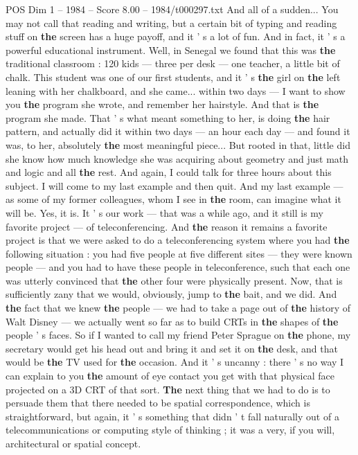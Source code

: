 \begin{textsample}{POS Dim 1 – 1984 – Score 8.00 – 1984/t000297.txt}
And all of a sudden...
You may not call that reading and writing, but a certain bit of typing and reading stuff on \textbf{the} screen has a huge payoff, and it ' s a lot of fun.
And in fact, it ' s a powerful educational instrument.
Well, in Senegal we found that this was \textbf{the} traditional classroom : 120 kids — three per desk — one teacher, a little bit of chalk.
This student was one of our first students, and it ' s \textbf{the} girl on \textbf{the} left leaning with her chalkboard, and she came... within two days — I want to show you \textbf{the} program she wrote, and remember her hairstyle.
And that is \textbf{the} program she made.
That ' s what meant something to her, is doing \textbf{the} hair pattern, and actually did it within two days — an hour each day — and found it was, to her, absolutely \textbf{the} most meaningful piece...
But rooted in that, little did she know how much knowledge she was acquiring about geometry and just math and logic and all \textbf{the} rest.
And again, I could talk for three hours about this subject.
I will come to my last example and then quit.
And my last example — as some of my former colleagues, whom I see in \textbf{the} room, can imagine what it will be.
Yes, it is.
It ' s our work — that was a while ago, and it still is my favorite project — of teleconferencing.
And \textbf{the} reason it remains a favorite project is that we were asked to do a teleconferencing system where you had \textbf{the} following situation : you had five people at five different sites — they were known people — and you had to have these people in teleconference, such that each one was utterly convinced that \textbf{the} other four were physically present.
Now, that is sufficiently zany that we would, obviously, jump to \textbf{the} bait, and we did.
And \textbf{the} fact that we knew \textbf{the} people — we had to take a page out of \textbf{the} history of Walt Disney — we actually went so far as to build CRTs in \textbf{the} shapes of \textbf{the} people ' s faces.
So if I wanted to call my friend Peter Sprague on \textbf{the} phone, my secretary would get his head out and bring it and set it on \textbf{the} desk, and that would be \textbf{the} TV used for \textbf{the} occasion.
And it ' s uncanny : there ' s no way I can explain to you \textbf{the} amount of eye contact you get with that physical face projected on a 3D CRT of that sort. \textbf{The} next thing that we had to do is to persuade them that there needed to be spatial correspondence, which is straightforward, but again, it ' s something that didn ' t fall naturally out of a telecommunications or computing style of thinking ; it was a very, if you will, architectural or spatial concept.

\end{textsample}
